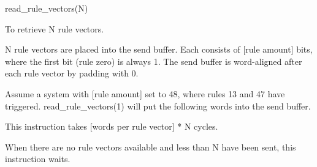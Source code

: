 

\format
read\_rule\_vectors(N)

\purpose

To retrieve N rule vectors.

\description

N rule vectors are placed into the send buffer.
Each consists of [rule amount] bits, where the first bit (rule zero) is always 1.
The send buffer is word-aligned after each rule vector by padding with 0.

\example

Assume a system with [rule amount] set to 48, where rules 13 and 47 have triggered.
read\_rule\_vectors(1) will put the following words into the send buffer.


\notes

This instruction takes [words per rule vector] * N cycles.

When there are no rule vectors available and less than N have been sent, this instruction waits.

